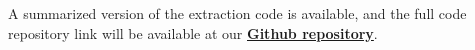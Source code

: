 \documentclass[sigconf, review]{acmart}
\begin{document}




A summarized version of the extraction code is available, and the full code repository link will be available at our \href{https://github.com/YuvrajSingh-mist/Public-Sports-Controversy/tree/master}{{\bf Github repository}}.




\end{document}
